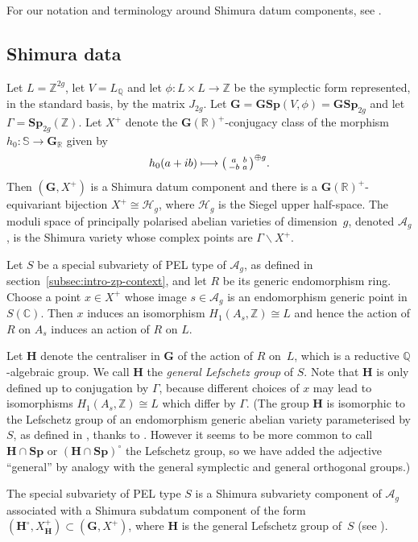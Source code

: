 \documentclass[JEP,XML,SOM,Unicode,NoFloatCountersInSection]{cedram}
\def\mto{\mathchoice{\longmapsto}{\mapsto}{\mapsto}{\mapsto}}
\newcommand{\bC}{\mathbb{C}}
\newcommand{\bQ}{\mathbb{Q}}
\newcommand{\bR}{\mathbb{R}}
\newcommand{\bZ}{\mathbb{Z}}
\newcommand{\Ag}{\mathcal{A}_g}
\newcommand{\Hg}{\mathcal{H}_g}
\newcommand{\gG}{\mathbf{G}}
\newcommand{\gGSp}{\mathbf{GSp}}
\newcommand{\gH}{\mathbf{H}}
\newcommand{\gSp}{\mathbf{Sp}}
\newcommand{\fullsmallmatrix}[4]{\bigl( \begin{smallmatrix} #1 & #2 \\ #3 & #4 \end{smallmatrix} \bigr)}
\newcommand{\defterm}[1]{\emph{#1}}
\begin{document}
For our notation and terminology around Shimura datum components, see \cite[sec.\ 2A and~2B]{ExCM}.

\subsection{Shimura data} \label{subsec:shimura-data}

Let $L=\bZ^{2g}$, let $V = L_\bQ$ and let $\phi:L\times L\to\bZ$ be the symplectic form represented, in the standard basis, by the matrix $J_{2g}$. Let $\gG=\gGSp(V, \phi)=\gGSp_{2g}$ and let $\Gamma=\gSp_{2g}(\bZ)$.
Let $X^+$ denote the $\gG(\bR)^+$-conjugacy class of the morphism $h_0 \colon \mathbb{S}\to\gG_\bR$ given by
\begin{equation} \label{eqn:h0}
h_0(a+ib) \mto \fullsmallmatrix{a}{b}{-b}{a}^{\oplus g}.
\end{equation}
Then $(\gG, X^+)$ is a Shimura datum component and there is a $\gG(\bR)^+$-equivariant bijection $X^+ \cong \Hg$, where $\Hg$ is the Siegel upper half-space.
The moduli space of principally polarised abelian varieties of dimension~$g$, denoted $\Ag$, is the Shimura variety whose complex points are $\Gamma \backslash X^+$.

Let $S$ be a special subvariety of PEL type of $\Ag$, as defined in section~\ref{subsec:intro-zp-context}, and let $R$ be its generic endomorphism ring.
Choose a point $x \in X^+$ whose image $s \in \Ag$ is an endomorphism generic point in $S(\bC)$.
Then $x$ induces an isomorphism $H_1(A_s, \bZ) \cong L$ and hence the action of $R$ on $A_s$ induces an action of $R$ on $L$.

Let $\gH$ denote the centraliser in $\gG$ of the action of $R$ on~$L$, which is a reductive $\bQ$-algebraic group.
We call $\gH$ the \defterm{general Lefschetz group} of $S$.
Note that $\gH$ is only defined up to conjugation by $\Gamma$, because different choices of $x$ may lead to isomorphisms $H_1(A_s, \bZ) \cong L$ which differ by $\Gamma$.
(The group $\gH$ is isomorphic to the Lefschetz group of an endomorphism generic abelian variety parameterised by $S$, as defined in \cite{Mil99}, thanks to \cite[Th.\,4.4]{Mil99}.
However it seems to be more common to call $\gH \cap \gSp$ or $(\gH \cap \gSp)^\circ$ the Lefschetz group, so we have added the adjective ``general'' by analogy with the general symplectic and general orthogonal groups.)

The special subvariety of PEL type $S$ is a Shimura subvariety component of $\Ag$ associated with a Shimura subdatum component of the form $(\gH^\circ, X_\gH^+) \subset (\gG, X^+)$, where $\gH$ is the general Lefschetz group of~$S$ (see \cite[paragraph above Theorem~8.17]{Mil05}).
\end{document}

